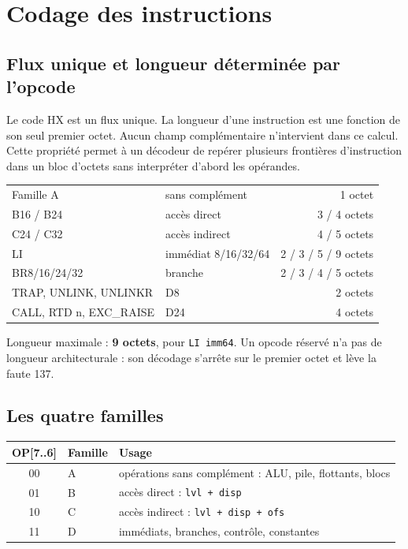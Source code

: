 \documentclass[10pt,a4paper,twoside,openany]{book}
\newcommand{\code}[1]{\texttt{#1}}
\begin{document}
\chapter{Codage des instructions}
\section{Flux unique et longueur déterminée par l'opcode}
Le code HX est un flux unique. La longueur d'une instruction est une fonction de son seul premier octet. Aucun champ complémentaire n'intervient dans ce calcul. Cette propriété permet à un décodeur de repérer plusieurs frontières d'instruction dans un bloc d'octets sans interpréter d'abord les opérandes.

\begin{architecturebox}[Longueurs]
\begin{tabularx}{\linewidth}{@{}lXr@{}}
Famille A & sans complément & 1 octet\\
B16 / B24 & accès direct & 3 / 4 octets\\
C24 / C32 & accès indirect & 4 / 5 octets\\
LI & immédiat 8/16/32/64 & 2 / 3 / 5 / 9 octets\\
BR8/16/24/32 & branche & 2 / 3 / 4 / 5 octets\\
TRAP, UNLINK, UNLINKR & D8 & 2 octets\\
CALL, RTD n, EXC\_RAISE & D24 & 4 octets\\
\end{tabularx}
Longueur maximale : \textbf{9 octets}, pour \texttt{LI imm64}. Un opcode réservé n'a pas de longueur architecturale : son décodage s'arrête sur le premier octet et lève la faute 137.
\end{architecturebox}

\section{Les quatre familles}
\begin{center}
\begin{tabularx}{\linewidth}{@{}clX@{}}
\toprule
\textbf{OP[7..6]} & \textbf{Famille} & \textbf{Usage}\\ \midrule
00 & A & opérations sans complément : ALU, pile, flottants, blocs\\
01 & B & accès direct : \code{lvl + disp}\\
10 & C & accès indirect : \code{lvl + disp + ofs}\\
11 & D & immédiats, branches, contrôle, constantes\\
\bottomrule
\end{tabularx}
\end{center}
\end{document}
